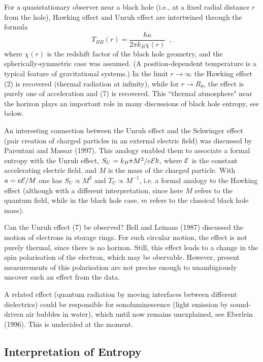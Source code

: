 \documentclass[12pt]{article}
\newcommand{\be}{\begin{equation}}
\newcommand{\ee}{\end{equation}}
\begin{document}
For a quasistationary observer near a black hole (i.e., at
a fixed radial distance $r$ from the hole), Hawking effect and
Unruh effect are intertwined through the formula
\be T_{BH}(r)=\frac{\hbar\kappa}{2\pi k_B\chi(r)} \enspace , \ee
where $\chi(r)$ is the redshift factor of the black hole geometry,
and the spherically-symmetric case was assumed.
(A position-dependent temperature is a typical feature of
gravitational systems.)
In the limit $r\to\infty$ the Hawking effect (2) is recovered
(thermal radiation at infinity), while for $r\to R_0$, the
effect is purely one of acceleration and (7) is recovered.
This ``thermal atmosphere" near the horizon plays an important role
in many discussions of black hole entropy, see below.

An interesting connection between the Unruh effect and the
Schwinger effect (pair creation of charged particles in an external
electric field) was discussed by Parentani and Massar (1997).
This analogy enabled them to associate a formal entropy with
the Unruh effect, $S_U=k_B\pi M^2/e{\cal E}\hbar$,
 where ${\cal E}$ is the constant accelerating electric field,
and $M$ is the mass of the charged particle. With $a=e{\cal E}/M$
one has $S_U\propto M^2$ and $T_U\propto M^{-1}$, i.e. a formal analogy
to the Hawking effect (although with a different interpretation,
since here $M$ refers to the quantum field, while in the
black hole case, $m$ refers to the classical black hole mass).

\vskip 2mm
\small

Can the Unruh effect (7) be observed? Bell and Leinaas (1987)
discussed the motion of electrons in storage rings. For such circular
motion, the effect is not purely thermal, since there is no horizon.
Still, this effect leads to a change in the spin polarisation of
the electron, which may be obervable. However, present measurements
of this polarisation are not precise enough to unambigiously 
uncover such an effect from the data.

A related effect (quantum radiation by moving interfaces between
different dielectrics) could be responsible for sonoluminescence
(light emission by sound-driven air bubbles in water), which 
until now remains unexplained, see Eberlein (1996). This is
undecided at the moment.

\normalsize  

\subsection{Interpretation of Entropy}
\end{document}
